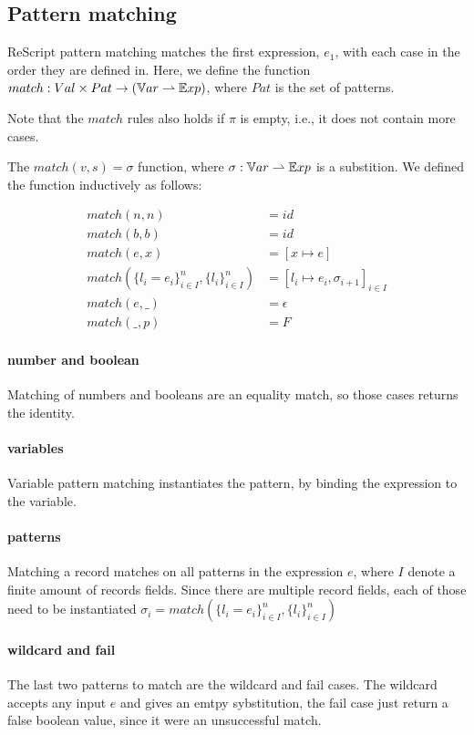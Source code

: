 \documentclass[../../master.tex]{subfiles}
\begin{document}
\subsection{Pattern matching}
ReScript pattern matching matches the first expression, $e_1$, with each case in the order they are defined in.
Here, we define the function $match:Val \times Pat \rightarrow (\mathbb{V}ar \rightharpoonup \mathbb{E}xp)$, where $Pat$ is the set of patterns.

Note that the $match$ rules also holds if $\pi$ is empty, i.e., it does not contain more cases.

The $match(v,s)=\sigma$ function, where $\sigma:\mathbb{V}ar \rightharpoonup \mathbb{E}xp$ is a substition.
We defined the function inductively as follows:

\begin{align*}
	match(n,n) &= id\\
	match(b,b) &= id\\
	match(e,x) &= [x \mapsto e]\\
	match(\{l_i=e_i\}^n_{i \in I},\{l_i\}^n_{i \in I}) &= [l_i \mapsto e_i, \sigma_{i+1}]_{i \in I}\\
	match(e,\_) &=\epsilon\\
	match(\_,p) &= F
\end{align*}

\paragraph{number and boolean}
Matching of numbers and booleans are an equality match, so those cases returns the identity.

\paragraph{variables}
Variable pattern matching instantiates the pattern, by binding the expression to the variable.

\paragraph{patterns}
Matching a record matches on all patterns in the expression $e$, where $I$ denote a finite amount of records fields.
Since there are multiple record fields, each of those need to be instantiated
$\sigma_i=match(\{l_i=e_i\}^n_{i \in I},\{l_i\}^n_{i \in I})$

\paragraph{wildcard and fail}
The last two patterns to match are the wildcard and fail cases.
The wildcard accepts any input $e$ and gives an emtpy sybstitution, the fail case just return a false boolean value, since it were an unsuccessful match.
\end{document}
